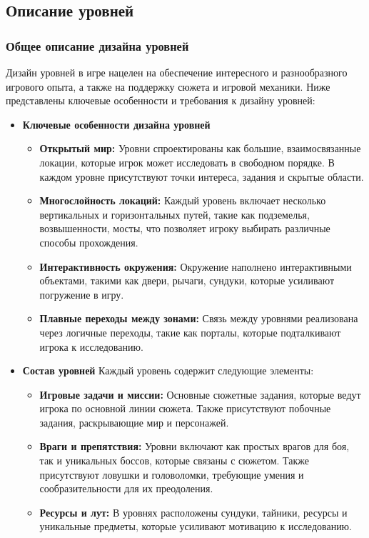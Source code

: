 \documentclass{article}
\begin{document}
\subsection{Описание уровней}

\subsubsection{Общее описание дизайна уровней}

Дизайн уровней в игре нацелен на обеспечение интересного и разнообразного игрового опыта, а также на поддержку сюжета и игровой механики. Ниже представлены ключевые особенности и требования к дизайну уровней:
\begin{itemize}
 \item \textbf{Ключевые особенности дизайна уровней}
\begin{itemize}
    \item \textbf{Открытый мир:} Уровни спроектированы как большие, взаимосвязанные локации, которые игрок может исследовать в свободном порядке. В каждом уровне присутствуют точки интереса, задания и скрытые области.
    \item \textbf{Многослойность локаций:} Каждый уровень включает несколько вертикальных и горизонтальных путей, такие как подземелья, возвышенности, мосты, что позволяет игроку выбирать различные способы прохождения.
    \item \textbf{Интерактивность окружения:} Окружение наполнено интерактивными объектами, такими как двери, рычаги, сундуки, которые усиливают погружение в игру.
    \item \textbf{Плавные переходы между зонами:} Связь между уровнями реализована через логичные переходы, такие как порталы, которые подталкивают игрока к исследованию.
\end{itemize}

 \item \textbf{Состав уровней}
Каждый уровень содержит следующие элементы:
\begin{itemize}
    \item \textbf{Игровые задачи и миссии:} Основные сюжетные задания, которые ведут игрока по основной линии сюжета. Также присутствуют побочные задания, раскрывающие мир и персонажей.
    \item \textbf{Враги и препятствия:} Уровни включают как простых врагов для боя, так и уникальных боссов, которые связаны с сюжетом. Также присутствуют ловушки и головоломки, требующие умения и сообразительности для их преодоления.
    \item \textbf{Ресурсы и лут:} В уровнях расположены сундуки, тайники, ресурсы и уникальные предметы, которые усиливают мотивацию к исследованию.
\end{itemize}


\end{itemize}
\end{document}
